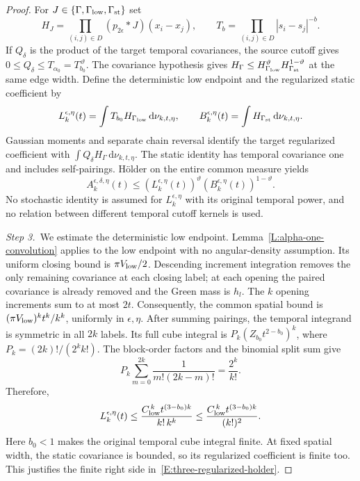 \documentclass[12pt,oneside,openany]{book}
\numberwithin{equation}{section}
\theoremstyle{nogostyle}
\theoremstyle{definition}
\newcommand{\ud}{\,\mathrm{d}}
\begin{document}
\begin{proof}
  For $J \in \{\Gamma,\Gamma_{\rm low},\Gamma_{\rm st}\}$ set
  \[
    H_J=\prod_{(i,j)\in D}(p_{2\epsilon}*J)(x_i-x_j),\qquad
    T_b=\prod_{(i,j)\in D}|s_i-s_j|^{-b}.
  \]
  If $Q_\delta$ is the product of the target temporal covariances, the source
  cutoff gives $0 \le Q_\delta \le T_{\alpha_0} = T_{b_0}^{\,\vartheta}$. The
  covariance hypothesis gives $H_\Gamma \le H_{\Gamma_{\rm low}}^\vartheta
  H_{\Gamma_{\rm st}}^{1-\vartheta}$ at the same edge width. Define the
  deterministic low endpoint and the regularized static coefficient by
  \[
    L_k^{\epsilon,\eta}(t)
    =\int T_{b_0}H_{\Gamma_{\rm low}}\ud\nu_{k,t,\eta},
    \qquad
    B_k^{\epsilon,\eta}(t)
    =\int H_{\Gamma_{\rm st}}\ud\nu_{k,t,\eta}.
  \]
  Gaussian moments and separate chain reversal identify the target regularized
  coefficient with $\int Q_\delta H_\Gamma \ud\nu_{k,t,\eta}$. The static
  identity has temporal covariance one and includes self-pairings. H\"older on
  the entire common measure yields
  \begin{equation}\label{E:three-regularized-holder}
    A_k^{\epsilon,\delta,\eta}(t)
    \le\left(L_k^{\epsilon,\eta}(t)\right)^\vartheta
    \left(B_k^{\epsilon,\eta}(t)\right)^{1-\vartheta}.
  \end{equation}
  No stochastic identity is assumed for $L_k^{\epsilon,\eta}$ with its original
  temporal power, and no relation between different temporal cutoff kernels is
  used.


  \medskip
  \noindent\textit{Step 3.~}We estimate the deterministic low endpoint.
  Lemma~\ref{L:alpha-one-convolution} applies to the low endpoint with no
  angular-density assumption. Its uniform closing bound is $\pi V_{\rm low}/2$.
  Descending increment integration removes the only remaining covariance at each
  closing label; at each opening the paired covariance is already removed and
  the Green mass is $h_l$. The $k$ opening increments sum to at most $2t$.
  Consequently, the common spatial bound is $(\pi V_{\rm low})^kt^k/k^k$,
  uniformly in $\epsilon,\eta$. After summing pairings, the temporal integrand
  is symmetric in all $2k$ labels. Its full cube integral is
  $P_k(Z_{b_0}t^{2-b_0})^k$, where $P_k = (2k)!/(2^kk!)$. The block-order
  factors and the binomial split sum give
  \[
    P_k\sum_{m=0}^{2k}\frac1{m!(2k-m)!}=\frac{2^k}{k!}.
  \]
  Therefore,
  \begin{equation}\label{E:three-low-coefficient}
    L_k^{\epsilon,\eta}(t)
    \le\frac{C_{\rm low}^{\,k}t^{(3-b_0)k}}{k!\,k^k}
    \le\frac{C_{\rm low}^{\,k}t^{(3-b_0)k}}{(k!)^2}.
  \end{equation}
  Here $b_0 < 1$ makes the original temporal cube integral finite. At fixed
  spatial width, the static covariance is bounded, so its regularized
  coefficient is finite too. This justifies the finite right side
  in~\eqref{E:three-regularized-holder}.



\end{proof}
\end{document}
